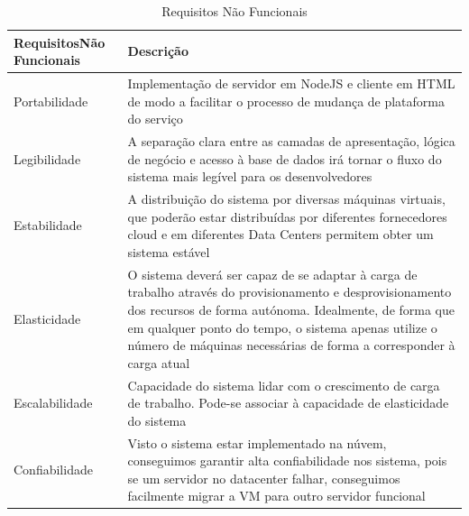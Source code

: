 \documentclass[11pt,a4paper]{article}
\begin{document}
\begin{table}[H]
	\begin{center}
		\begin{tabular}{|p{3.5cm}|p{9.5cm}|}
		\hline
			\textbf{Requisitos\newline Não Funcionais} & \textbf{Descrição}\\ \hline
			Portabilidade & Implementação de servidor em NodeJS e cliente em HTML de modo a facilitar o processo de mudança de plataforma do serviço \\ \hline
			Legibilidade & A separação clara entre as camadas de apresentação, lógica de negócio e acesso à base de dados irá tornar o fluxo do sistema mais legível para os desenvolvedores \\ \hline
			Estabilidade & A distribuição do sistema por diversas máquinas virtuais, que poderão estar distribuídas por diferentes fornecedores cloud e em diferentes Data Centers permitem obter um sistema estável \\ \hline
			Elasticidade & O sistema deverá ser capaz de se adaptar à carga de trabalho através do provisionamento e desprovisionamento dos recursos de forma autónoma. Idealmente, de forma que em qualquer ponto do tempo, o sistema apenas utilize o número de máquinas necessárias de forma a corresponder à carga atual \\ \hline
			Escalabilidade & Capacidade do sistema lidar com o crescimento de carga de trabalho. Pode-se associar à capacidade de elasticidade do sistema \\ \hline
			Confiabilidade & Visto o sistema estar implementado na núvem, conseguimos garantir alta confiabilidade nos sistema, pois se um servidor no datacenter falhar, conseguimos facilmente migrar a VM para outro servidor funcional \\ \hline
	\end{tabular}
	\label{tab1}
	\end{center}
	\caption{Requisitos Não Funcionais}
\end{table}
\end{document}

